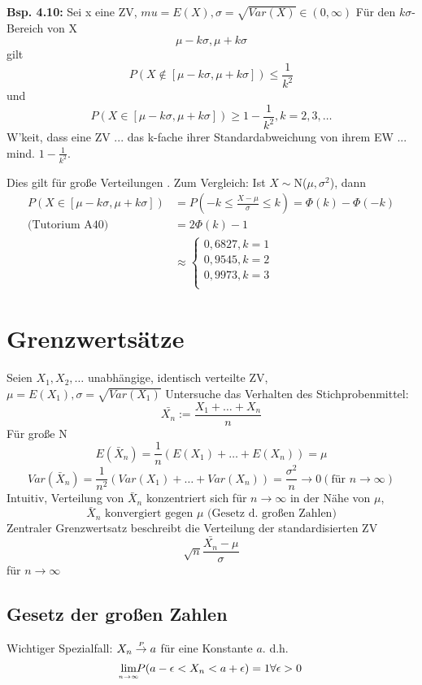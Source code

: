 \documentclass[a4paper,11pt]{article}
\begin{document}
\vspace{6pt}
\noindent\textbf{Bsp. 4.10:}
Sei x eine ZV, $mu=E(X), \sigma=\sqrt{Var(X)} \in (0,\infty)$
\newline Für den $k\sigma$-Bereich von X 
\[\mu - k\sigma, \mu + k\sigma\]
gilt
\[P(X\notin[\mu - k\sigma, \mu + k\sigma])\leq\frac{1}{k^2}\]
und
\[P(X\in[\mu - k\sigma, \mu + k\sigma])\geq 1-\frac{1}{k^2}, k=2,3,\dots\]
W'keit, dass eine ZV ... das k-fache ihrer Standardabweichung von ihrem EW ... mind. $1-\frac{1}{k^2}$.

\vspace{6pt}
\noindent Dies gilt für große Verteilungen .
\newline Zum Vergleich: Ist $X\sim$N($\mu,\sigma^2$), dann
\begin{align*}
P(X\in[\mu - k\sigma, \mu + k\sigma]) &= P(-k \leq \frac{X-\mu}{\sigma} \leq k) = \Phi(k) - \Phi(-k)\\
\text{(Tutorium A40) }&= 2\Phi(k)-1\\
&\approx \begin{cases}
0,6827, k=1\\
0,9545, k=2\\
0,9973, k=3\\
\end{cases}
\end{align*}

\section{Grenzwertsätze}
Seien $X_1,X_2,\dots$ unabhängige, identisch verteilte ZV, $\mu=E(X_1), \sigma = \sqrt{Var(X_1)}$
\newline Untersuche das Verhalten des Stichprobenmittel:
\[\bar{X_n} := \frac{X_1+\dots+X_n}{n}\]
Für große N 
\[E(\bar{X}_n) = \frac{1}{n}(E(X_1)+\dots+E(X_n))=\mu\]
\[Var(\bar{X}_n) = \frac{1}{n^2}(Var(X_1)+\dots+Var(X_n)) = \frac{\sigma^2}{n} \rightarrow 0 (\text{für }n\rightarrow\infty)\]
Intuitiv, Verteilung von $\bar{X}_n$ konzentriert sich für $n\rightarrow\infty$ in der Nähe von $\mu$, 
\[\bar{X}_n \text{ konvergiert gegen }\mu \text{ (Gesetz d. großen Zahlen)}\]
Zentraler Grenzwertsatz beschreibt die Verteilung der standardisierten ZV 
\[\sqrt{n}\frac{\bar{X_n}-\mu}{\sigma}\]
für $n\rightarrow\infty$

\subsection{Gesetz der großen Zahlen}
Wichtiger Spezialfall: $X_n\overset{\mathclap{\scriptscriptstyle P}}{\rightarrow} a$ für eine Konstante $a$. 
\newline d.h. 
\[\underset{\mathclap{\scriptscriptstyle n\rightarrow\infty}}{\text{lim}} P(a-\epsilon < X_n < a + \epsilon) = 1 \forall\epsilon>0\]
\end{document}
